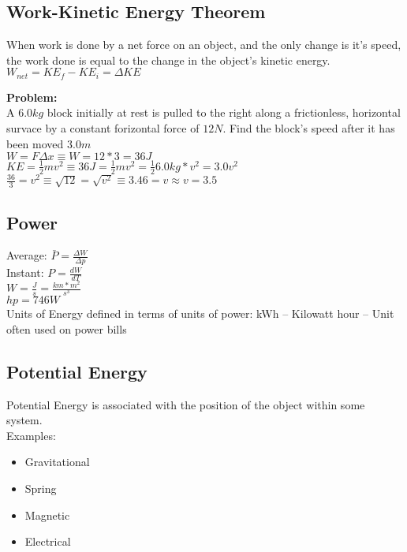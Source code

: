 \documentclass[]{article}
\begin{document}
\subsection*{Work-Kinetic Energy Theorem}
When work is done by a net force on an object, and the only change is it's speed, the work done is equal to the change in the object's kinetic energy.\\
$W_{net} = KE_f-KE_i = \Delta KE$

\textbf{Problem:}\\
A $6.0 kg$ block initially at rest is pulled to the right along a frictionless, horizontal survace by a constant forizontal force of $12N$. Find the block's speed after it has been moved $3.0m$\\
$W = F\Delta x \equiv W = 12 * 3 = 36J$\\
$KE = \frac{1}{2}mv^2 \equiv 36J = \frac{1}{2}mv^2 = \frac{1}{2}6.0kg * v^2 = 3.0 v^2 $\\
$\frac{36}{3} = v^2 \equiv \sqrt{12} = \sqrt{v^2} \equiv 3.46 = v \approx v = 3.5$


\subsection*{Power}
Average:
$\bar{P} = \frac{\Delta W}{\Delta p} $\\
Instant:
$P = \frac{dW}{dT}$\\
$W = \frac{J}{s} = \frac{km * m^2}{s^3}$\\
$hp = 746W$\\

Units of Energy defined in terms of units of power:
kWh -- Kilowatt hour -- Unit often used on power bills


\subsection*{Potential Energy}
Potential Energy is associated with the position of the object within some system.\\
Examples:\\
\begin{itemize}
    \item Gravitational
    \item Spring
    \item Magnetic
    \item Electrical
\end{itemize}
\end{document}

